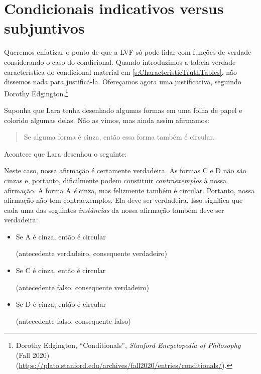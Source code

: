 \section{Condicionais indicativos versus subjuntivos}\label{s:IndicativeSubjunctive}
Queremos enfatizar o ponto de que a LVF só pode lidar com funções de verdade considerando o caso do condicional. Quando introduzimos a tabela-verdade característica do condicional material em \cref{s:CharacteristicTruthTables}, não dissemos nada para justificá-la. Ofereçamos agora uma justificativa, seguindo Dorothy Edgington.\footnote{Dorothy Edgington, \textquotedblleft{}Conditionals\textquotedblright{},
\textit{Stanford Encyclopedia of Philosophy} (Fall 2020)
(\url{https://plato.stanford.edu/archives/fall2020/entries/conditionals/}).}

Suponha que Lara tenha desenhado algumas formas em uma folha de papel e colorido algumas delas. Não as vimos, mas ainda assim afirmamos:
	\begin{quote}
		Se alguma forma é cinza, então essa forma também é circular.
	\end{quote}
Acontece que Lara desenhou o seguinte:
\begin{center}
\end{center}
Neste caso, nossa afirmação é certamente verdadeira. As formas C e D não são cinzas e, portanto, dificilmente podem constituir \emph{contraexemplos} à nossa afirmação. A forma A \emph{é} cinza, mas felizmente também é circular. Portanto, nossa afirmação não tem contraexemplos. Ela deve ser verdadeira. Isso significa que cada uma das seguintes \emph{instâncias} da nossa afirmação também deve ser verdadeira:
	\begin{itemize}
		\item Se A é cinza, então é circular

		\qquad (antecedente verdadeiro, consequente verdadeiro)
		\item Se C é cinza, então é circular

		\qquad (antecedente falso, consequente verdadeiro)
		\item Se D é cinza, então é circular

		\qquad (antecedente falso, consequente falso)
	\end{itemize}
